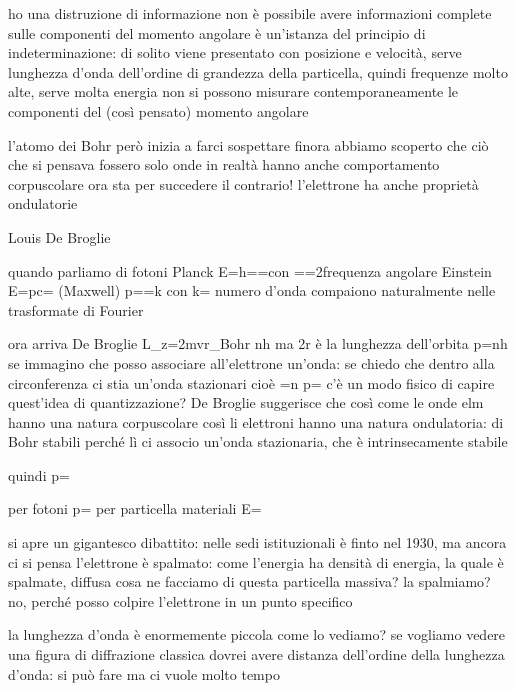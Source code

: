 \begin{itemize}
{{{{{{ho una distruzione di informazione
non è possibile avere informazioni complete sulle componenti del momento angolare
è un'istanza del principio di indeterminazione: di solito viene presentato con posizione e velocità, serve lunghezza d'onda dell'ordine di grandezza della particella, quindi frequenze molto alte, serve molta energia
non si possono misurare contemporaneamente le componenti del (così pensato) momento angolare

l'atomo dei Bohr però inizia a farci sospettare
finora abbiamo scoperto che ciò che si pensava fossero solo onde in realtà hanno anche comportamento corpuscolare
ora sta per succedere il contrario!
l'elettrone ha anche proprietà ondulatorie

Louis De Broglie

quando parliamo di fotoni
	Planck 	E=h\nu==\hslash \omega 	con \omega==2\pi\nu frequenza angolare
	Einstein	E=pc= (Maxwell)	
	\implies p==\hslash k	con k=\frac{2\pi}{\lambda} numero d'onda
compaiono naturalmente nelle trasformate di Fourier

ora arriva De Broglie
	L_z=2\pi mvr\underbrace{=}_{Bohr} nh
	ma 2\pi r è la lunghezza dell'orbita 
	\implies p=nh
se immagino che posso associare all'elettrone un'onda: se chiedo che dentro alla circonferenza ci stia un'onda stazionari
	cioè =n\lambda
	\implies p=
c'è un modo fisico di capire quest'idea di quantizzazione?
De Broglie suggerisce che così come le onde elm hanno una natura corpuscolare così li elettroni hanno una natura ondulatoria: di Bohr stabili perché lì ci associo un'onda stazionaria, che è intrinsecamente stabile

quindi 	p=

per fotoni p=
per particella materiali E=


si apre un gigantesco dibattito: nelle sedi istituzionali è finto nel 1930, ma ancora ci si pensa
l'elettrone è spalmato: come l'energia ha densità di energia, la quale è spalmate, diffusa
cosa ne facciamo di questa particella massiva? la spalmiamo?
no, perché posso colpire l'elettrone in un punto specifico

la lunghezza d'onda \lambda è enormemente piccola
come lo vediamo?
se vogliamo vedere una figura di diffrazione classica dovrei avere distanza dell'ordine della lunghezza d'onda: si può fare ma ci vuole molto tempo

}}}}}}
\end{itemize}
